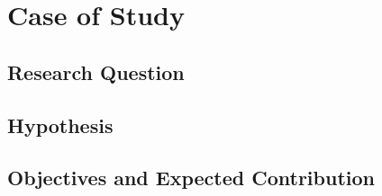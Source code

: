 \section{Case of Study}
\label{sec:case}

\subsection{Research Question}

\subsection{Hypothesis}

\subsection{Objectives and Expected Contribution}
